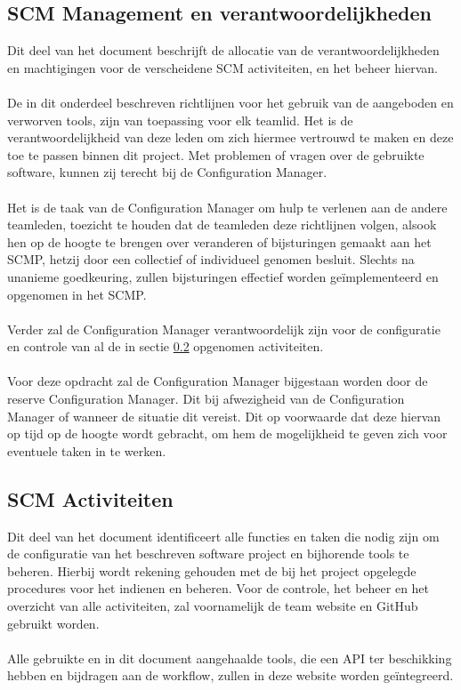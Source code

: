 \subsection{SCM Management en verantwoordelijkheden}
Dit deel van het document beschrijft de allocatie van de verantwoordelijkheden en machtigingen voor de verscheidene SCM activiteiten, en het beheer hiervan.
\\
\\
De in dit onderdeel beschreven richtlijnen voor het gebruik van de aangeboden en verworven tools, zijn van toepassing voor elk teamlid. Het is de verantwoordelijkheid van deze leden om zich hiermee vertrouwd te maken en deze toe te passen binnen dit project. Met problemen of vragen over de gebruikte software, kunnen zij terecht bij de Configuration Manager.
\\
\\
Het is de taak van de Configuration Manager om hulp te verlenen aan de andere teamleden, toezicht te houden dat de teamleden deze richtlijnen volgen, alsook hen op de hoogte te brengen over veranderen of bijsturingen gemaakt aan het SCMP, hetzij door een collectief of individueel genomen besluit. Slechts na unanieme goedkeuring, zullen bijsturingen effectief worden geïmplementeerd en opgenomen in het SCMP.
\\
\\
Verder zal de Configuration Manager verantwoordelijk zijn voor de configuratie en controle van al de in sectie \ref{sec:SCMActiviteiten} opgenomen activiteiten.
\\
\\
Voor deze opdracht zal de Configuration Manager bijgestaan worden door de reserve Configuration Manager. Dit bij afwezigheid van de Configuration Manager of wanneer de situatie dit vereist. Dit op voorwaarde dat deze hiervan op tijd op de hoogte wordt gebracht, om hem de mogelijkheid te geven zich voor eventuele taken in te werken.

\subsection{SCM Activiteiten} \label{sec:SCMActiviteiten}
Dit deel van het document identificeert alle functies en taken die nodig zijn om de configuratie van het beschreven software project en bijhorende tools te beheren. Hierbij wordt rekening gehouden met de bij het project opgelegde procedures voor het indienen en beheren. Voor de controle, het beheer en het overzicht van alle activiteiten, zal voornamelijk de team website \cite{portalWebsite} en GitHub gebruikt worden.
\\
\\
Alle gebruikte en in dit document aangehaalde tools, die een API ter beschikking hebben en bijdragen aan de workflow, zullen in deze website worden geïntegreerd.

